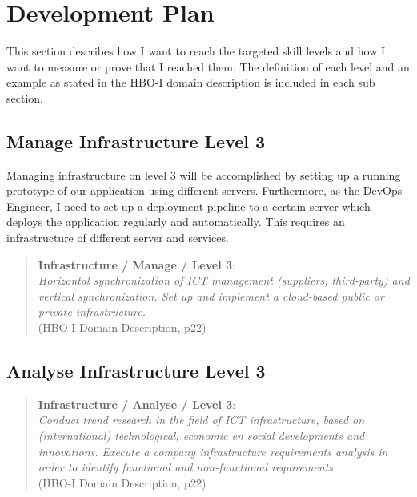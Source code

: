 
\section{Development Plan}
\label{sec:development}

This section describes how I want to reach the targeted skill levels and how I want to measure or prove that I reached them.
The definition of each level and an example as stated in the HBO-I domain description is included in each sub section.

\subsection{Manage Infrastructure Level 3}

Managing infrastructure on level 3 will be accomplished by setting up a running prototype of our application using different servers.
Furthermore, as the DevOps Engineer, I need to set up a deployment pipeline to a certain server which deploys the application regularly and automatically. This requires an infrastructure of different server and services.

\begin{quote}
	\textbf{Infrastructure / Manage / Level 3}: \\
	\textit{
		Horizontal synchronization of ICT management (suppliers, third-party) and vertical synchronization.
		Set up and implement a cloud-based public or private infrastructure.
	} \\ (HBO-I Domain Description, p22)
\end{quote}


\subsection{Analyse Infrastructure Level 3}



\begin{quote}
	\textbf{Infrastructure / Analyse / Level 3}: \\
	\textit{
		Conduct trend research in the field of ICT infrastructure, based on (international) technological, economic en social developments and innovations. 
		Execute a company infrastructure requirements analysis in order to identify functional and non-functional requirements.
	} \\ (HBO-I Domain Description, p22)
\end{quote}

